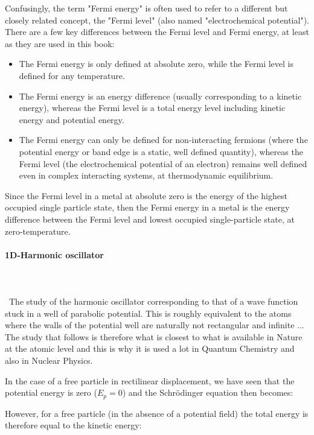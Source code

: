 	
	Confusingly, the term "Fermi energy" is often used to refer to a different but closely related concept, the "Fermi level" (also named "electrochemical potential"). There are a few key differences between the Fermi level and Fermi energy, at least as they are used in this book:
	\begin{itemize}
		\item The Fermi energy is only defined at absolute zero, while the Fermi level is defined for any temperature.

		\item The Fermi energy is an energy difference (usually corresponding to a kinetic energy), whereas the Fermi level is a total energy level including kinetic energy and potential energy.

		\item The Fermi energy can only be defined for non-interacting fermions (where the potential energy or band edge is a static, well defined quantity), whereas the Fermi level (the electrochemical potential of an electron) remains well defined even in complex interacting systems, at thermodynamic equilibrium.
	\end{itemize}
	Since the Fermi level in a metal at absolute zero is the energy of the highest occupied single particle state, then the Fermi energy in a metal is the energy difference between the Fermi level and lowest occupied single-particle state, at zero-temperature.
	
	
	\paragraph{1D-Harmonic oscillator}\label{quantum harmonic oscillator}\mbox{}\\\\\
	The study of the harmonic oscillator corresponding to that of a wave function stuck in a well of parabolic potential. This is roughly equivalent to the atoms where the walls of the potential well are naturally not rectangular and infinite ... The study that follows is therefore what is closest to what is available in Nature at the atomic level and this is why it is used a lot in Quantum Chemistry and also in Nuclear Physics.

	In the case of a free particle in rectilinear displacement, we have seen that the potential energy is zero ($E_p=0$) and the Schrödinger equation then becomes:
	
	However, for a free particle (in the absence of a potential field) the total energy is therefore equal to the kinetic energy:
	

